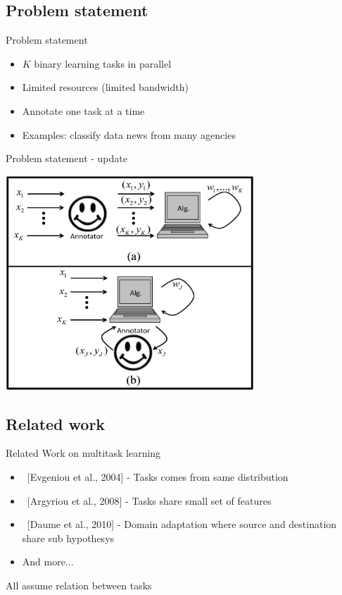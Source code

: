 \documentclass{beamer}
\begin{document}
\subsection{Problem statement}

\begin{frame}{Problem statement}
\begin{itemize}
\item $K$ binary learning tasks  in parallel\newline
\item Limited resources (limited bandwidth) \newline
\item Annotate one task at a time \newline

\item Examples: classify data news from many agencies\newline
\end{itemize}
\end{frame}


\begin{frame}{Problem statement - update}
\begin{center}
\includegraphics[width=0.7\textwidth]{figs/SHAMPO_illustration.eps}
\end{center}
\end{frame}

\subsection{Related work}

\begin{frame}{ Related Work on multitask learning}

\begin{itemize}
\item \ [Evgeniou et al., 2004] - Tasks comes from same distribution\\
\item \ [Argyriou et al., 2008] - Tasks share small set of features\\
\item \ [Daume et al., 2010] -  Domain adaptation where source and destination share sub hypothesys
\item And more...
\end{itemize}

 All assume relation between  tasks

\end{frame}
\end{document}
